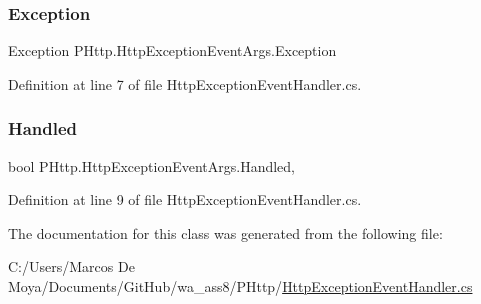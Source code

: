 \subsubsection{\texorpdfstring{Exception}{Exception}}
{\footnotesize\ttfamily Exception P\+Http.\+Http\+Exception\+Event\+Args.\+Exception\hspace{0.3cm}{\ttfamily [get]}}



Definition at line 7 of file Http\+Exception\+Event\+Handler.\+cs.

\mbox{\label{class_p_http_1_1_http_exception_event_args_ad138d1df1d0d01496abb4bf49e81b6d3}} 
\subsubsection{\texorpdfstring{Handled}{Handled}}
{\footnotesize\ttfamily bool P\+Http.\+Http\+Exception\+Event\+Args.\+Handled\hspace{0.3cm}{\ttfamily [get]}, {\ttfamily [set]}}



Definition at line 9 of file Http\+Exception\+Event\+Handler.\+cs.



The documentation for this class was generated from the following file\+:\begin{DoxyCompactItemize}
\item 
C\+:/\+Users/\+Marcos De Moya/\+Documents/\+Git\+Hub/wa\+\_\+ass8/\+P\+Http/\hyperlink{_http_exception_event_handler_8cs}{Http\+Exception\+Event\+Handler.\+cs}\end{DoxyCompactItemize}
